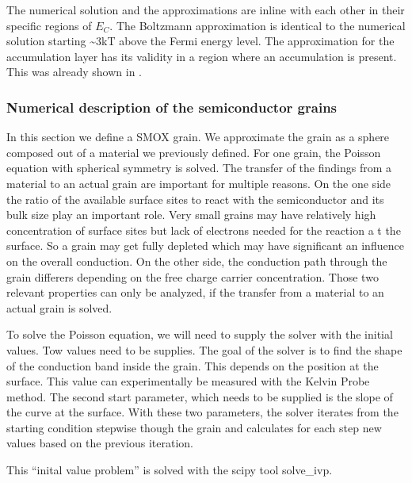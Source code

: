 \documentclass[11pt]{article}
\begin{document}
    The numerical solution and the approximations are inline with each other
in their specific regions of \(E_C\). The Boltzmann approximation is
identical to the numerical solution starting \textasciitilde3kT above
the Fermi energy level. The approximation for the accumulation layer has
its validity in a region where an accumulation is present. This was
already shown in \cite{Barsan2011a}.

    \hypertarget{numerical-description-of-the-semiconductor-grains}{%
\subsubsection{Numerical description of the semiconductor
grains}\label{numerical-description-of-the-semiconductor-grains}}

In this section we define a SMOX grain. We approximate the grain as a
sphere composed out of a material we previously defined. For one grain,
the Poisson equation with spherical symmetry is solved. The transfer of
the findings from a material to an actual grain are important for
multiple reasons. On the one side the ratio of the available surface
sites to react with the semiconductor and its bulk size play an
important role. Very small grains may have relatively high concentration
of surface sites but lack of electrons needed for the reaction a t the
surface. So a grain may get fully depleted which may have significant an
influence on the overall conduction. On the other side, the conduction
path through the grain differers depending on the free charge carrier
concentration. Those two relevant properties can only be analyzed, if
the transfer from a material to an actual grain is solved.

To solve the Poisson equation, we will need to supply the solver with
the initial values. Tow values need to be supplies. The goal of the
solver is to find the shape of the conduction band inside the grain.
This depends on the position at the surface. This value can
experimentally be measured with the Kelvin Probe method. The second
start parameter, which needs to be supplied is the slope of the curve at
the surface. With these two parameters, the solver iterates from the
starting condition stepwise though the grain and calculates for each
step new values based on the previous iteration.

This ``inital value problem'' is solved with the scipy tool solve\_ivp.
\end{document}
